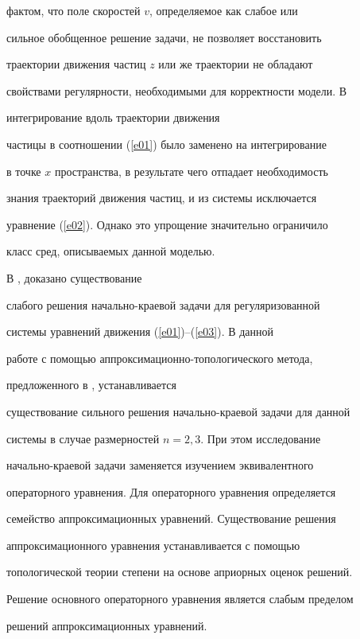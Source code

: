 фактом, что поле скоростей $v$, определяемое как слабое или


сильное обобщенное решение задачи, не позволяет восстановить


траектории движения частиц $z$ или же траектории не обладают


свойствами регулярности, необходимыми для корректности модели. В


\cite{AgSob2} интегрирование вдоль траектории движения


частицы в соотношении (\ref{e01}) было заменено на интегрирование


в точке $x$ пространства, в результате чего отпадает необходимость


знания траекторий движения частиц, и из системы исключается


уравнение (\ref{e02}). Однако это упрощение значительно ограничило


класс сред, описываемых данной моделью.





В \cite{ZvDm}, \cite{ZvDm1} доказано существование


слабого решения начально-краевой задачи для регуляризованной


системы уравнений движения (\ref{e01})--(\ref{e03}). В данной


работе с помощью аппроксимационно-топологического метода,


предложенного в \cite{DZ}, устанавливается


существование сильного решения начально-краевой задачи для данной


системы в случае размерностей $n=2,3$. При этом исследование


начально-краевой задачи заменяется изучением эквивалентного


операторного уравнения. Для операторного уравнения определяется


семейство аппроксимационных уравнений. Существование решения


аппроксимационного уравнения устанавливается с помощью


топологической теории степени на основе априорных оценок решений.


Решение основного операторного уравнения является слабым пределом


решений аппроксимационных уравнений.








